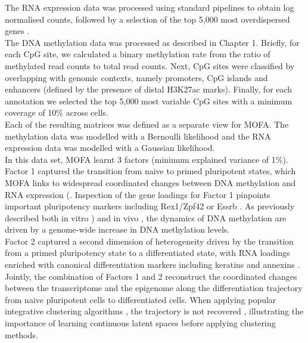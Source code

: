 The RNA expression data was processed using standard pipelines to obtain log normalised counts, followed by a selection of the top 5,000 most overdispersed genes \cite{Lun2016}.\\
The DNA methylation data was processed as described in Chapter 1. Briefly, for each CpG site, we calculated a binary methylation rate from the ratio of methylated read counts to total read counts. Next, CpG sites were classified by overlapping with genomic contexts, namely promoters, CpG islands and enhancers (defined by the presence of distal H3K27ac marks). Finally, for each annotation we selected the top 5,000 most variable CpG sites with a minimum coverage of 10\% across cells.\\
Each of the resulting matrices was defined as a separate view for MOFA. The methylation data was modelled with a Bernoulli likelihood and the RNA expression data was modelled with a Gaussian likelihood.\\

In this data set, MOFA learnt 3 factors (minimum explained variance of 1\%). Factor 1 captured the transition from naive to primed pluripotent states, which MOFA links to widespread coordinated changes between DNA methylation and RNA expression (. Inspection of the gene loadings for Factor 1 pinpoints important pluripotency markers including  Rex1/Zpf42 or Essrb \cite{Mohammed2017}. As previously described both in vitro \cite{Angermueller2016}) and in vivo \cite{Auclair2014}, the dynamics of DNA methylation are driven by a genome-wide increase in DNA methylation levels.\\
Factor 2 captured a second dimension of heterogeneity driven by the transition from a primed pluripotency state to a differentiated state, with RNA loadings enriched with canonical differentiation markers including keratins and annexins \cite{Fuchs1988}.\\

Jointly, the combination of Factors 1 and 2 reconstruct the coordinated changes between the transcriptome and the epigenome along the differentiation trajectory from naive pluripotent cells to differentiated cells. When applying popular integrative clustering algorithms \cite{Wang2014,Shen2009,Mo2013}, the trajectory is not recovered , illustrating the importance of learning continuous latent spaces before applying clustering methods.

